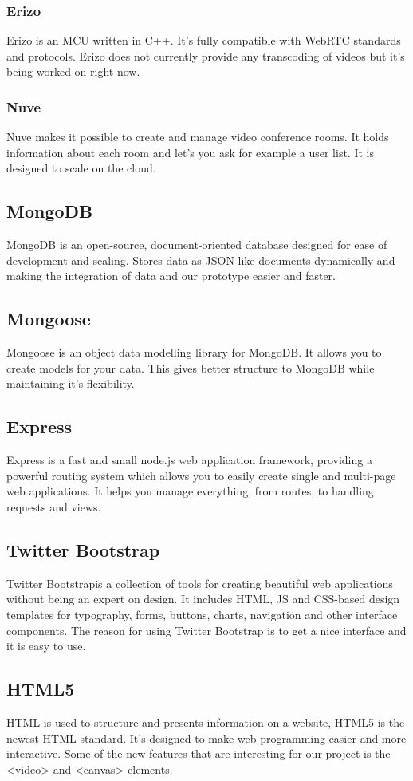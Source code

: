\documentclass[12pt, titlepage]{article}
\begin{document}
\subsubsection{Erizo}
Erizo is an MCU written in C++. It's fully compatible with WebRTC standards and protocols. Erizo does not currently provide any transcoding of videos but it's being worked on right now. 
\subsubsection{Nuve}
Nuve makes it possible to create and manage video conference rooms. It holds information about each room and let's you ask for example a user list. It is designed to scale on the cloud.
\subsection{MongoDB}
MongoDB\cite{30} is an open-source, document-oriented database designed for ease of development and scaling. Stores data as JSON-like documents dynamically and making the integration of data and our prototype easier and faster.
\subsection{Mongoose}
Mongoose\cite{31} is an object data modelling library for MongoDB. It allows you to create models for your data. This gives better structure to MongoDB while maintaining it's flexibility.
\subsection{Express}
Express\cite{32} is a fast and small node.js web application framework, providing a powerful routing system which allows you to easily create single and multi-page web applications. It helps you manage everything, from routes, to handling requests and views.
\subsection{Twitter Bootstrap}
Twitter Bootstrap\cite{33}is a collection of tools for creating beautiful web applications without being an expert on design. It includes HTML, JS and CSS-based design templates for typography, forms, buttons, charts, navigation and other interface components. The reason for using Twitter Bootstrap is to get a nice interface and it is easy to use.
\subsection{HTML5}
HTML is used to structure and presents information on a website, HTML5 is the newest HTML standard. It's designed to make web programming easier and more interactive. Some of the new features that are interesting for our project is the <video> and <canvas> elements.
\end{document}
